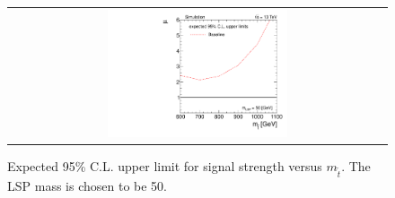 \begin{figure}[!h]
  \centering
  \begin{tabular}{c}
                \includegraphics[width=0.49\textwidth]{figures/limitplot4BinSel_Baseline_LSP50.pdf} 
  \end{tabular}
  \caption{Expected 95\% C.L. upper limit for signal strength versus $m_{\tilde{t}}$. The LSP mass is chosen to be 50\gev.}
  \label{fig:stop_baseline_limit}
\end{figure}

